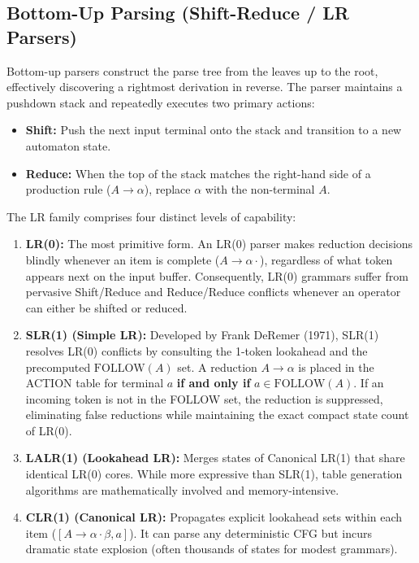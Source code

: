 \documentclass[11pt,a4paper]{article}
\begin{document}
\subsection{Bottom-Up Parsing (Shift-Reduce / LR Parsers)}
Bottom-up parsers construct the parse tree from the leaves up to the root, effectively discovering a rightmost derivation in reverse. The parser maintains a pushdown stack and repeatedly executes two primary actions:
\begin{itemize}
    \item \textbf{Shift:} Push the next input terminal onto the stack and transition to a new automaton state.
    \item \textbf{Reduce:} When the top of the stack matches the right-hand side of a production rule ($A \to \alpha$), replace $\alpha$ with the non-terminal $A$.
\end{itemize}

The LR family comprises four distinct levels of capability:
\begin{enumerate}
    \item \textbf{LR(0):} The most primitive form. An LR(0) parser makes reduction decisions blindly whenever an item is complete ($A \to \alpha \cdot$), regardless of what token appears next on the input buffer. Consequently, LR(0) grammars suffer from pervasive Shift/Reduce and Reduce/Reduce conflicts whenever an operator can either be shifted or reduced.
    \item \textbf{SLR(1) (Simple LR):} Developed by Frank DeRemer (1971), SLR(1) resolves LR(0) conflicts by consulting the 1-token lookahead and the precomputed $\text{FOLLOW}(A)$ set. A reduction $A \to \alpha$ is placed in the ACTION table for terminal $a$ \textbf{if and only if} $a \in \text{FOLLOW}(A)$. If an incoming token is not in the FOLLOW set, the reduction is suppressed, eliminating false reductions while maintaining the exact compact state count of LR(0).
    \item \textbf{LALR(1) (Lookahead LR):} Merges states of Canonical LR(1) that share identical LR(0) cores. While more expressive than SLR(1), table generation algorithms are mathematically involved and memory-intensive.
    \item \textbf{CLR(1) (Canonical LR):} Propagates explicit lookahead sets within each item ($[A \to \alpha \cdot \beta, a]$). It can parse any deterministic CFG but incurs dramatic state explosion (often thousands of states for modest grammars).
\end{enumerate}
\end{document}
